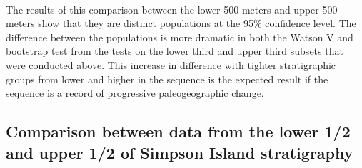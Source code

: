 \documentclass{article}
\begin{document}
    \begin{center}
    \end{center}
    { \hspace*{\fill} \\}
    
    The results of this comparison between the lower 500 meters and upper
500 meters show that they are distinct populations at the 95\%
confidence level. The difference between the populations is more
dramatic in both the Watson V and bootstrap test from the tests on the
lower third and upper third subsets that were conducted above. This
increase in difference with tighter stratigraphic groups from lower and
higher in the sequence is the expected result if the sequence is a
record of progressive paleogeographic change.


    \subsection{Comparison between data from the lower 1/2 and upper 1/2 of Simpson
Island stratigraphy}
\end{document}
